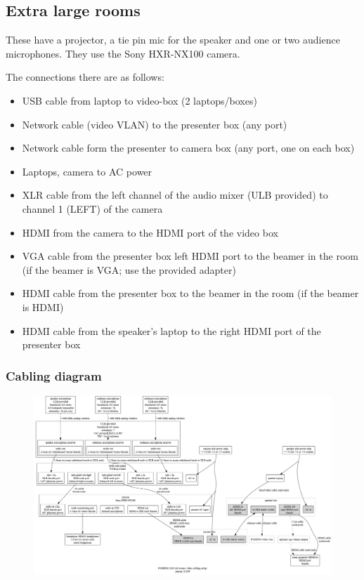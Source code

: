 \documentclass{article}
\begin{document}
\subsection{Extra large rooms}
These have a projector, a tie pin mic for the speaker and one or two audience microphones. They use the Sony HXR-NX100 camera.

The connections there are as follows:

\begin{itemize}
  \item USB cable from laptop to video-box (2 laptops/boxes)
  \item Network cable (video VLAN) to the presenter box (any port)
  \item Network cable form the presenter to camera box (any port, one on each box)
  \item Laptops, camera to AC power
  \item XLR cable from the left channel of the audio mixer (ULB provided) to channel 1 (LEFT) of the camera
  \item HDMI from the camera to the HDMI port of the video box
  \item VGA cable from the presenter box left HDMI port to the beamer in the room (if the beamer is VGA; use the provided adapter)
  \item HDMI cable from the presenter box to the beamer in the room (if the beamer is HDMI)
  \item HDMI cable from the speaker's laptop to the right HDMI port of the presenter box
\end{itemize}

\subsubsection{Cabling diagram}
\begin{figure}[H]
  \begin{sideways}
  \centering
  \includegraphics[width = 200mm]{../../graph/cabling_xxl_rooms.png}
  \end{sideways}
\end{figure}
\end{document}

